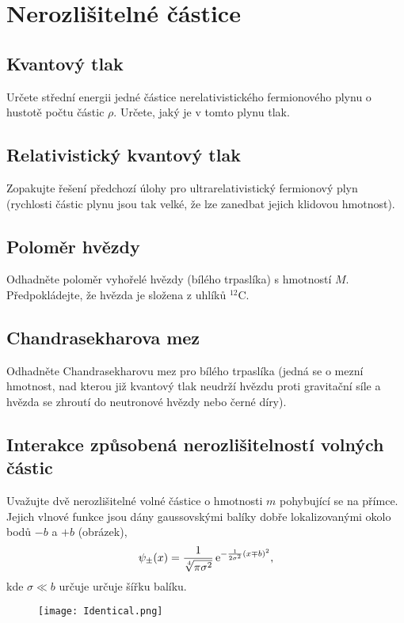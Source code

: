 \section{Nerozlišitelné částice}
    \subsection{Kvantový tlak}
        Určete střední energii jedné částice nerelativistického fermionového plynu o hustotě počtu částic $\rho$.
        Určete, jaký je v tomto plynu tlak.

    \subsection{Relativistický kvantový tlak}
        Zopakujte řešení předchozí úlohy pro ultrarelativistický fermionový plyn (rychlosti částic plynu jsou tak velké, že lze zanedbat jejich klidovou hmotnost).

    \subsection{Poloměr hvězdy}
        Odhadněte poloměr vyhořelé hvězdy (bílého trpaslíka) s hmotností $M$.
        Předpokládejte, že hvězda je složena z uhlíků $^{12}$C.

    \subsection{Chandrasekharova mez}
        Odhadněte Chandrasekharovu mez pro bílého trpaslíka (jedná se o mezní hmotnost, nad kterou již kvantový tlak neudrží hvězdu proti gravitační síle a hvězda se zhroutí do neutronové hvězdy nebo černé díry).

    \subsection{Interakce způsobená nerozlišitelností volných částic}
        Uvažujte dvě nerozlišitelné volné částice o hmotnosti $m$ pohybující se na přímce.
        Jejich vlnové funkce jsou dány gaussovskými balíky dobře lokalizovanými okolo bodů $-b$ a $+b$ (obrázek),
        \begin{equation}
            \psi_{\pm}(x)=\frac{1}{\sqrt[4]{\pi\sigma^{2}}}\operatorname{e}^{-\frac{1}{2\sigma^{2}}(x\mp b)^{2}},
        \end{equation}
        kde $\sigma\ll b$ určuje určuje šířku balíku.
        
        \begin{figure}[htbp!]
            \centering
            \texttt{[image: Identical.png]}
        \end{figure}

